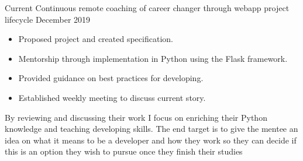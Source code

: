 %
%
%

  \begin{experiences}
    \mentoring
      {Current}
      {Continuous remote coaching of career changer through webapp project lifecycle}
      {December 2019}
      {
        \begin{itemize}
          \item Proposed project and created specification.
          \item Mentorship through implementation in Python using the Flask framework.
          \item Provided guidance on best practices for developing.
          \item Established weekly meeting to discuss current story.
        \end{itemize}
        {By reviewing and discussing their work I focus on enriching their Python knowledge and teaching developing skills.
        The end target is to give the mentee an idea on what it means to be a developer and how they work
        so they can decide if this is an option they wish to pursue once they finish their studies}
      }
  \end{experiences}